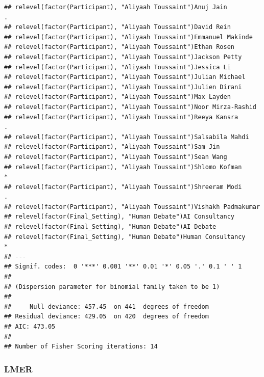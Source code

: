\documentclass[
]{article}
\newenvironment{Shaded}{\begin{snugshade}}{\end{snugshade}}
\newcommand{\AttributeTok}[1]{\textcolor[rgb]{0.13,0.29,0.53}{#1}}
\newcommand{\ConstantTok}[1]{\textcolor[rgb]{0.56,0.35,0.01}{#1}}
\newcommand{\DecValTok}[1]{\textcolor[rgb]{0.00,0.00,0.81}{#1}}
\newcommand{\FunctionTok}[1]{\textcolor[rgb]{0.13,0.29,0.53}{\textbf{#1}}}
\newcommand{\NormalTok}[1]{#1}
\newcommand{\OtherTok}[1]{\textcolor[rgb]{0.56,0.35,0.01}{#1}}
\newcommand{\SpecialCharTok}[1]{\textcolor[rgb]{0.81,0.36,0.00}{\textbf{#1}}}
\newcommand{\StringTok}[1]{\textcolor[rgb]{0.31,0.60,0.02}{#1}}
\begin{document}
\begin{verbatim}
## relevel(factor(Participant), "Aliyaah Toussaint")Anuj Jain          .  
## relevel(factor(Participant), "Aliyaah Toussaint")David Rein            
## relevel(factor(Participant), "Aliyaah Toussaint")Emmanuel Makinde      
## relevel(factor(Participant), "Aliyaah Toussaint")Ethan Rosen           
## relevel(factor(Participant), "Aliyaah Toussaint")Jackson Petty         
## relevel(factor(Participant), "Aliyaah Toussaint")Jessica Li            
## relevel(factor(Participant), "Aliyaah Toussaint")Julian Michael        
## relevel(factor(Participant), "Aliyaah Toussaint")Julien Dirani         
## relevel(factor(Participant), "Aliyaah Toussaint")Max Layden            
## relevel(factor(Participant), "Aliyaah Toussaint")Noor Mirza-Rashid     
## relevel(factor(Participant), "Aliyaah Toussaint")Reeya Kansra       .  
## relevel(factor(Participant), "Aliyaah Toussaint")Salsabila Mahdi       
## relevel(factor(Participant), "Aliyaah Toussaint")Sam Jin               
## relevel(factor(Participant), "Aliyaah Toussaint")Sean Wang             
## relevel(factor(Participant), "Aliyaah Toussaint")Shlomo Kofman      *  
## relevel(factor(Participant), "Aliyaah Toussaint")Shreeram Modi      .  
## relevel(factor(Participant), "Aliyaah Toussaint")Vishakh Padmakumar    
## relevel(factor(Final_Setting), "Human Debate")AI Consultancy           
## relevel(factor(Final_Setting), "Human Debate")AI Debate                
## relevel(factor(Final_Setting), "Human Debate")Human Consultancy     *  
## ---
## Signif. codes:  0 '***' 0.001 '**' 0.01 '*' 0.05 '.' 0.1 ' ' 1
## 
## (Dispersion parameter for binomial family taken to be 1)
## 
##     Null deviance: 457.45  on 441  degrees of freedom
## Residual deviance: 429.05  on 420  degrees of freedom
## AIC: 473.05
## 
## Number of Fisher Scoring iterations: 14
\end{verbatim}

\subsubsection{LMER}\label{lmer}

\begin{Shaded}
\end{Shaded}
\end{document}

